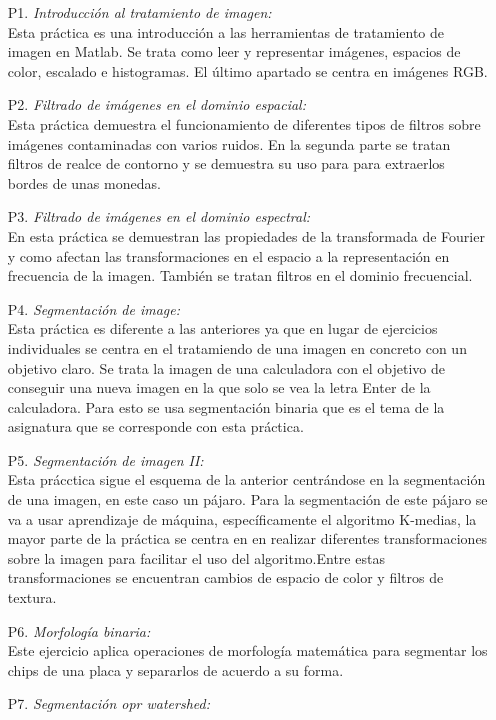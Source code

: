 \documentclass[a4paper,12pt]{report}
\begin{document}
\begin{itemize}
  \item [ P1.]\emph{Introducción al tratamiento de imagen:}\\
	Esta práctica es una introducción a las herramientas de tratamiento de imagen en Matlab. Se trata como leer y representar imágenes, espacios de color, escalado e histogramas. El último apartado se centra en imágenes RGB.
  \item [P2.]\emph{ Filtrado de imágenes en el dominio espacial:}\\
	Esta práctica demuestra el funcionamiento de diferentes tipos de filtros sobre imágenes contaminadas con varios ruidos. En la segunda parte se tratan filtros de realce de contorno y se demuestra su uso para para extraerlos bordes de unas monedas.
  \item [P3.]\emph{Filtrado de imágenes en el dominio espectral:}\\
	En esta práctica se demuestran las propiedades de la transformada de Fourier y como afectan las transformaciones en el espacio a la representación en frecuencia de la imagen. También se tratan filtros en el dominio frecuencial.
  \item [P4.]\emph{Segmentación de image:}\\
	Esta práctica es diferente a las anteriores ya que en lugar de ejercicios individuales se centra en el tratamiendo de una imagen en concreto con un objetivo claro. Se trata  la imagen de una calculadora con el objetivo de conseguir una nueva imagen en la que solo se vea la letra Enter de la calculadora. Para esto se usa segmentación binaria que es el tema de la asignatura que se corresponde con esta práctica.
  \item [P5.]\emph{Segmentación de imagen II:}\\
	Esta prácctica sigue el esquema de la anterior centrándose en la segmentación de una imagen, en este caso un pájaro. Para la segmentación de este pájaro se va a usar aprendizaje de máquina, específicamente el algoritmo K-medias, la mayor parte de la práctica se centra en en realizar diferentes transformaciones sobre la imagen para facilitar el uso del algoritmo.Entre estas transformaciones se encuentran cambios de espacio de color y filtros de textura.
  \item [P6.]\emph{Morfología binaria:}\\
	Este ejercicio aplica operaciones de morfología matemática para segmentar los chips de una placa y separarlos de acuerdo a su forma.
  \item [P7.]\emph{Segmentación opr watershed:}\\

\end{itemize}
\end{document}
